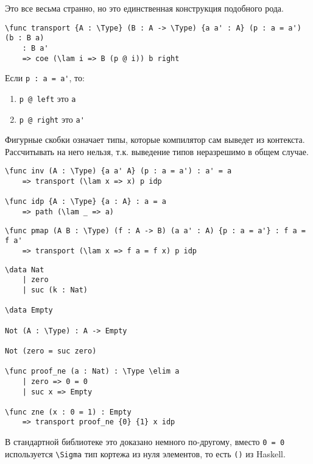 Это все весьма странно, но это единственная конструкция подобного рода.

\begin{verbatim}
\func transport {A : \Type} (B : A -> \Type) {a a' : A} (p : a = a') (b : B a)
    : B a'
    => coe (\lam i => B (p @ i)) b right
\end{verbatim}

\begin{obozn}
    Если \verb!p : a = a'!, то:
    \begin{enumerate}
        \item \verb!p @ left! это \verb!a!
        \item \verb!p @ right! это \verb!a'!
    \end{enumerate}
\end{obozn}

\begin{remark}
    Фигурные скобки означает типы, которые компилятор сам выведет из контекста. Рассчитывать на него нельзя, т.к. выведение типов неразрешимо в общем случае.
\end{remark}

\begin{example}\itemfix
    \begin{verbatim}
\func inv (A : \Type) {a a' A} (p : a = a') : a' = a
    => transport (\lam x => x) p idp

\func idp {A : \Type} {a : A} : a = a
    => path (\lam _ => a)
        \end{verbatim}
\end{example}

\begin{example}[конгруэнтность]\itemfix
    \begin{verbatim}
\func pmap (A B : \Type) (f : A -> B) (a a' : A) {p : a = a'} : f a = f a'
    => transport (\lam x => f a = f x) p idp
    \end{verbatim}
\end{example}

\begin{example}\itemfix
    \begin{verbatim}
\data Nat
    | zero
    | suc (k : Nat)
    
\data Empty

Not (A : \Type) : A -> Empty

Not (zero = suc zero)

\func proof_ne (a : Nat) : \Type \elim a
    | zero => 0 = 0
    | suc x => Empty
    
\func zne (x : 0 = 1) : Empty
    => transport proof_ne {0} {1} x idp
    \end{verbatim}
\end{example}

\begin{remark}
    В стандартной библиотеке это доказано немного по-другому, вместо \verb!0 = 0! используется \verb!\Sigma! тип кортежа из нуля элементов, то есть \verb!()! из Haskell.
\end{remark}
